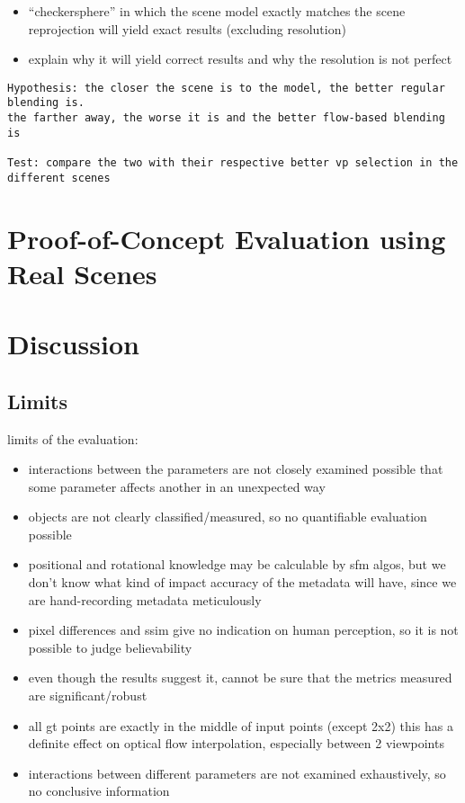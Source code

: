 \begin{itemize}
  \item ``checkersphere'' in which the scene model exactly matches the scene
    \ar reprojection will yield exact results (excluding resolution)
  \item explain why it will yield correct results and why the resolution is not perfect
\end{itemize}
\begin{verbatim}
Hypothesis: the closer the scene is to the model, the better regular blending is.
the farther away, the worse it is and the better flow-based blending is

Test: compare the two with their respective better vp selection in the different scenes

\end{verbatim}



\section{Proof-of-Concept Evaluation using Real Scenes} \label{sec:pof_eval}

\section{Discussion} \label{sec:discussion}

\subsection{Limits}

limits of the evaluation:
\begin{itemize}
  \item interactions between the parameters are not closely examined \ar possible that some parameter affects another in an unexpected way
  \item objects are not clearly classified/measured, so no quantifiable evaluation possible
  \item positional and rotational knowledge may be calculable by sfm algos, but we don't know what kind of impact accuracy of the metadata will have, since we are hand-recording metadata meticulously
  \item pixel differences and ssim give no indication on human perception, so it is not possible to judge believability
  \item even though the results suggest it, cannot be sure that the metrics measured are significant/robust
  \item all gt points are exactly in the middle of input points (except 2x2) this has a definite effect on optical flow interpolation, especially between 2 viewpoints
  \item interactions between different parameters are not examined exhaustively, so no conclusive information
\end{itemize}

